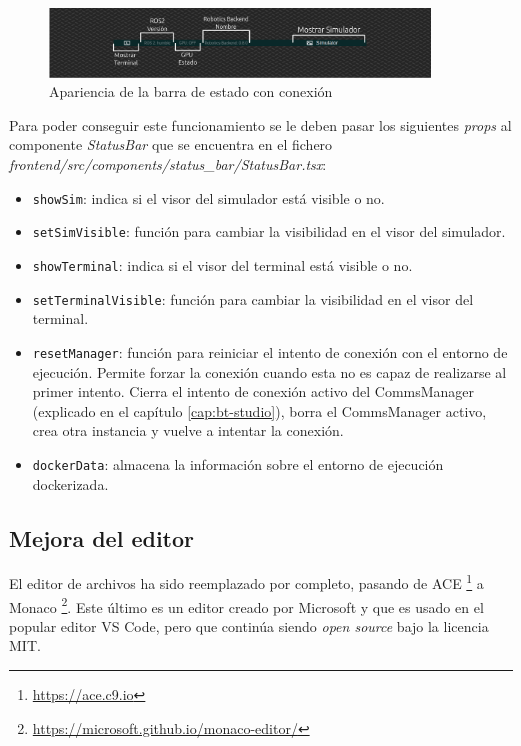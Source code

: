 \begin{figure}[H]
    \centering
    \includegraphics[width=0.9\textwidth]{figures/bt-avances/status-bar.png}
    \caption{Apariencia de la barra de estado con conexión}
    \label{fig:status-bar}
\end{figure}

Para poder conseguir este funcionamiento se le deben pasar los siguientes \textit{props} al componente \textit{StatusBar} que se encuentra en el fichero \textit{frontend/src/components/status\_bar/StatusBar.tsx}:

\begin{itemize}
    \item \texttt{showSim}: indica si el visor del simulador está visible o no. 
    \item \texttt{setSimVisible}: función para cambiar la visibilidad en el visor del simulador.
    \item \texttt{showTerminal}: indica si el visor del terminal está visible o no. 
    \item \texttt{setTerminalVisible}: función para cambiar la visibilidad en el visor del terminal.
    \item \texttt{resetManager}: función para reiniciar el intento de conexión con el entorno de ejecución. Permite forzar la conexión cuando esta no es capaz de realizarse al primer intento. Cierra el intento de conexión activo del CommsManager (explicado en el capítulo \ref{cap:bt-studio}), borra el CommsManager activo, crea otra instancia y vuelve a intentar la conexión.
    \item \texttt{dockerData}: almacena la información sobre el entorno de ejecución dockerizada. 
\end{itemize}

\subsection{Mejora del editor}\label{sec:bt-monaco}

El editor de archivos ha sido reemplazado por completo, pasando de ACE \footnote{\url{https://ace.c9.io}} a Monaco \footnote{\url{https://microsoft.github.io/monaco-editor/}}. Este último es un editor creado por Microsoft y que es usado en el popular editor VS Code, pero que continúa siendo \textit{open source} bajo la licencia MIT.

